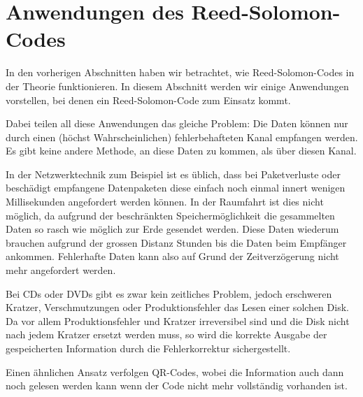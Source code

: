 %
%
%
\section{Anwendungen des Reed-Solomon-Codes
	\label{reedsolomon:section:anwendung}}

In den vorherigen Abschnitten haben wir betrachtet, wie Reed-Solomon-Codes in der Theorie funktionieren. 
In diesem Abschnitt werden wir einige Anwendungen vorstellen, bei denen ein Reed-Solomon-Code zum Einsatz kommt.

Dabei teilen all diese Anwendungen das gleiche Problem: Die Daten können nur durch einen (höchst Wahrscheinlichen) fehlerbehafteten Kanal empfangen werden. Es gibt keine andere Methode, an diese Daten zu kommen, als über diesen Kanal.

In der Netzwerktechnik zum Beispiel ist es üblich, dass bei Paketverluste oder beschädigt empfangene Datenpaketen diese einfach noch einmal innert wenigen Millisekunden angefordert werden können.
In der Raumfahrt ist dies nicht möglich, da aufgrund der beschränkten Speichermöglichkeit die gesammelten Daten so rasch wie möglich zur Erde gesendet werden. 
Diese Daten wiederum brauchen aufgrund der grossen Distanz Stunden bis die Daten beim Empfänger ankommen.
Fehlerhafte Daten kann also auf Grund der Zeitverzögerung nicht mehr angefordert werden. 

Bei CDs oder DVDs gibt es zwar kein zeitliches Problem, jedoch erschweren Kratzer, Verschmutzungen oder Produktionsfehler das Lesen einer solchen Disk.
Da vor allem Produktionsfehler und Kratzer irreversibel sind und die Disk nicht nach jedem Kratzer ersetzt werden muss, so wird die korrekte Ausgabe der gespeicherten Information durch die Fehlerkorrektur sichergestellt. 

Einen ähnlichen Ansatz verfolgen QR-Codes, wobei die Information auch dann noch gelesen werden kann wenn der Code nicht mehr vollständig vorhanden ist. 

%
%
%
%
%

